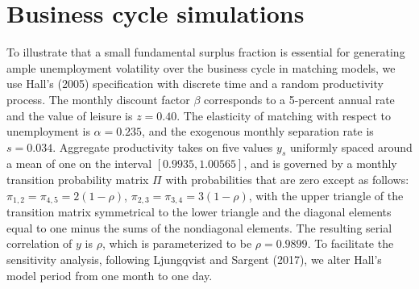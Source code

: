 \section{Business cycle simulations}\label{sec:FS_simulations}%
%
To illustrate that a small fundamental surplus fraction is essential for
generating ample unemployment volatility over the business cycle in
matching models, we use  Hall's (2005) specification
with discrete time and a  random productivity process.
The monthly discount factor $\beta$ corresponds to a 5-percent annual
rate and the value of leisure is $z=0.40$. The elasticity of
matching with respect to unemployment is $\alpha=0.235$, and the
exogenous monthly separation rate is $s=0.034$. Aggregate productivity
takes on five  values $y_s$ uniformly spaced around a mean of
one on the interval $[0.9935, 1.00565]$, and is governed by
a monthly transition probability matrix $\Pi$ with probabilities
that are zero except as follows: $\pi_{1,2}=\pi_{4,5}=2(1-\rho)$,
$\pi_{2,3}=\pi_{3,4}=3(1-\rho)$, with the upper triangle of the
transition matrix symmetrical to the lower triangle and the
diagonal elements equal to one minus the sums of the nondiagonal
elements. The resulting serial correlation of $y$ is $\rho$, which
is parameterized to be $\rho=0.9899$.
To facilitate the
sensitivity analysis, following Ljungqvist and Sargent (2017), we alter
Hall's model period from one month to one day.




